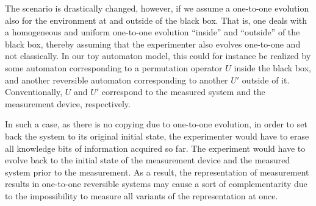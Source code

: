 \documentclass[pra,amsfonts,twocolumn]{revtex4}
\begin{document}
The scenario is drastically changed, however, if we assume a
one-to-one evolution also for the environment at and outside
of the black box. That is, one deals with a
homogeneous
and uniform one-to-one evolution ``inside'' and ``outside'' of the black
box, thereby
assuming that the experimenter also evolves
one-to-one and not classically.
In our toy automaton model, this could for instance be realized by some
automaton corresponding to a permutation operator $U$ inside the black
box, and another reversible automaton corresponding to another $U'$
outside of it. Conventionally, $U$ and $U'$ correspond to the measured
system and the measurement device, respectively.

In such a case, as there is no copying due to one-to-one evolution,
in order to set
back the system to its original initial state, the experimenter would
have to erase all knowledge bits of information acquired so far.
The experiment would have to evolve back to the initial state of the
measurement device and the measured system prior to the measurement.
As a result, the representation of measurement results in one-to-one
reversible systems may cause a sort of complementarity due to
the impossibility to measure all variants of the representation
at once.
\end{document}
